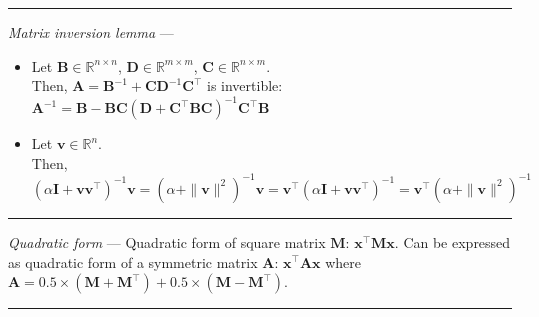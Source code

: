 {\color{lightgray}\hrule height 0.001mm}

\emph{Matrix inversion lemma} ---
\begin{itemize}
    \item Let $\boldsymbol{B} \in \mathbb{R}^{n \times n}$, $\boldsymbol{D} \in \mathbb{R}^{m \times m}$, $\boldsymbol{C} \in \mathbb{R}^{n \times m}$.\\
    Then, $\boldsymbol{A} = \boldsymbol{B}^{-1} + \boldsymbol{C}\boldsymbol{D}^{-1}\boldsymbol{C}^\intercal$ is invertible: $\boldsymbol{A}^{-1} = \boldsymbol{B} - \boldsymbol{B}\boldsymbol{C} (\boldsymbol{D}+\boldsymbol{C}^\intercal\boldsymbol{B}\boldsymbol{C})^{-1}\boldsymbol{C}^\intercal\boldsymbol{B}$
    \item Let $\boldsymbol{v} \in \mathbb{R}^{n}$.\\
    Then, $(\alpha \boldsymbol{I} + \boldsymbol{v}\boldsymbol{v}^\intercal)^{-1}\boldsymbol{v} = (\alpha + \|\boldsymbol{v}\|^2)^{-1}\boldsymbol{v} = \boldsymbol{v}^\intercal(\alpha \boldsymbol{I} + \boldsymbol{v}\boldsymbol{v}^\intercal)^{-1} = \boldsymbol{v}^\intercal(\alpha + \|\boldsymbol{v}\|^2)^{-1}$
\end{itemize}
 
{\color{lightgray}\hrule height 0.001mm}

\emph{Quadratic form} --- Quadratic form of square matrix $\boldsymbol{M}$: $\boldsymbol{x}^\intercal\boldsymbol{M}\boldsymbol{x}$. Can be expressed as quadratic form of a symmetric matrix $\boldsymbol{A}$: $\boldsymbol{x}^\intercal\boldsymbol{A}\boldsymbol{x}$ where $\boldsymbol{A} = 0.5 \times (\boldsymbol{M} + \boldsymbol{M}^\intercal) + 0.5 \times (\boldsymbol{M} - \boldsymbol{M}^\intercal)$.

{\color{lightgray}\hrule height 0.001mm}


